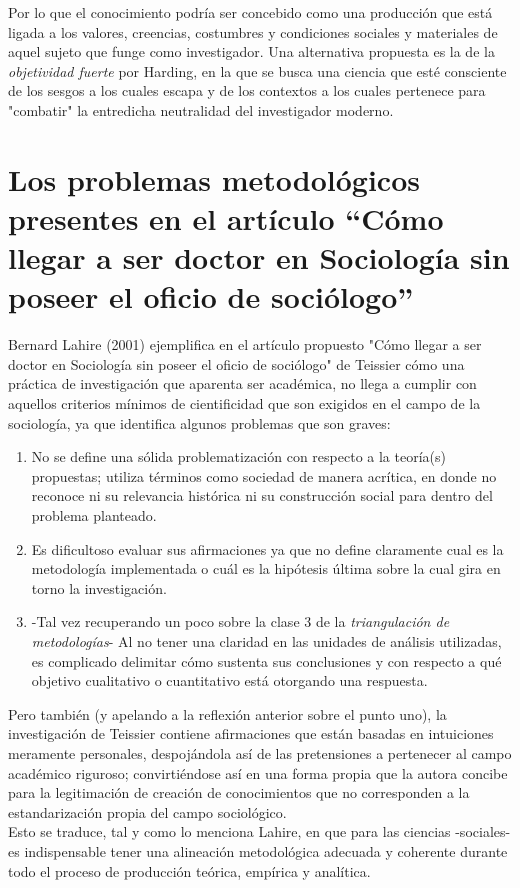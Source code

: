 \documentclass{article}
\begin{document}
\noindent Por lo que el conocimiento podría ser concebido como una producción que está ligada a los valores, creencias, costumbres y condiciones sociales y materiales de aquel sujeto que funge como investigador. Una alternativa propuesta es la de la \textit{objetividad fuerte} por Harding, en la que se busca una ciencia que esté consciente de los sesgos a los cuales escapa y de los contextos a los cuales pertenece para "combatir" la entredicha neutralidad del investigador moderno.

\section{Los problemas metodológicos presentes en el artículo “Cómo llegar a ser doctor en Sociología sin poseer el oficio de sociólogo”} %

Bernard Lahire (2001) ejemplifica en el artículo propuesto "Cómo llegar a ser doctor en Sociología sin poseer el oficio de sociólogo" de Teissier cómo una práctica de investigación que aparenta ser académica, no llega a cumplir con aquellos criterios mínimos de cientificidad que son exigidos en el campo de la sociología, ya que identifica algunos problemas que son graves:

\begin{enumerate}
	\item No se define una sólida problematización con respecto a la teoría(s) propuestas; utiliza términos como sociedad de manera acrítica, en donde no reconoce ni su relevancia histórica ni su construcción social para dentro del problema planteado.
	\item Es dificultoso evaluar sus afirmaciones ya que no define claramente cual es la metodología implementada o cuál es la hipótesis última sobre la cual gira en torno la investigación.
	\item -Tal vez recuperando un poco sobre la clase 3 de la \textit{triangulación de metodologías}- Al no tener una claridad en las unidades de análisis utilizadas, es complicado delimitar cómo sustenta sus conclusiones y con respecto a qué objetivo cualitativo o cuantitativo está otorgando una respuesta.
\end{enumerate}

Pero también (y apelando a la reflexión anterior sobre el punto uno), la investigación de Teissier contiene afirmaciones que están basadas en intuiciones meramente personales, despojándola así de las pretensiones a pertenecer al campo académico riguroso; convirtiéndose así en una forma propia que la autora concibe para la legitimación de creación de conocimientos que no corresponden a la estandarización propia del campo sociológico.\\

\noindent Esto se traduce, tal y como lo menciona Lahire, en que para las ciencias -sociales- es indispensable tener una alineación metodológica adecuada y coherente durante todo el proceso de producción teórica, empírica y analítica.

\end{document}
